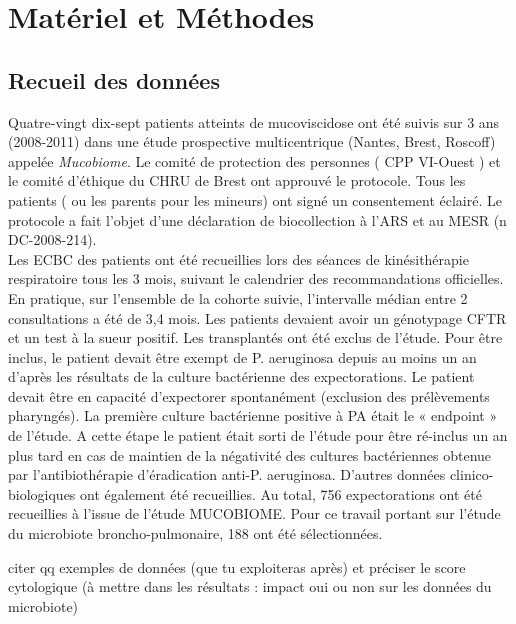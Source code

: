 \documentclass[12pt,a4paper]{article}
\begin{document}
\section{Matériel et Méthodes}
\subsection{Recueil des données}

Quatre-vingt dix-sept patients atteints de mucoviscidose ont été suivis sur 3 ans (2008-2011) dans une étude prospective multicentrique (Nantes, Brest, Roscoff) appelée \textit{Mucobiome}.
Le comité de protection des personnes ( CPP VI-Ouest ) et le comité d’éthique du CHRU de Brest ont approuvé le protocole. Tous les patients ( ou les parents pour les mineurs) ont signé un consentement éclairé. Le protocole a fait l’objet d’une déclaration de biocollection à l’ARS et au MESR (n DC-2008-214).\\
Les ECBC des patients ont été recueillies lors des séances de kinésithérapie respiratoire tous les 3 mois, suivant le calendrier des recommandations officielles. En pratique, sur l’ensemble de la cohorte suivie, l’intervalle médian entre 2 consultations a été de 3,4 mois.
Les patients devaient avoir un génotypage CFTR et un test à la sueur positif. Les transplantés ont été exclus de l’étude.
Pour être inclus, le patient devait être exempt de P. aeruginosa depuis au moins un an d’après les résultats de la culture bactérienne des expectorations. Le patient devait être en capacité d’expectorer spontanément (exclusion des prélèvements pharyngés).
La première culture bactérienne positive à PA était le « endpoint » de l’étude. A cette étape le patient était sorti de l’étude pour être ré-inclus un an plus tard en cas de maintien de la négativité des cultures bactériennes obtenue par l’antibiothérapie d’éradication anti-P. aeruginosa. D’autres données clinico-biologiques ont également été recueillies. Au total, 756 expectorations ont été recueillies à l’issue de l’étude MUCOBIOME. Pour ce travail portant sur l’étude du microbiote broncho-pulmonaire, 188 ont été sélectionnées.

citer qq exemples de données (que tu exploiteras après) et préciser le score
cytologique (à mettre dans les résultats : impact oui ou non sur les données du microbiote)
\end{document}
